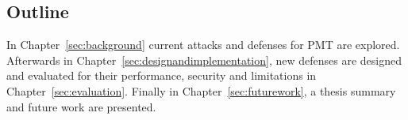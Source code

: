 \subsection{Outline}
In Chapter~\ref{sec:background} current attacks and defenses for \gls{PMT} are explored. Afterwards in Chapter~\ref{sec:designandimplementation}, new defenses are designed and evaluated for their performance, security and limitations in Chapter~\ref{sec:evaluation}. Finally in Chapter~\ref{sec:futurework}, a thesis summary and future work are presented.
